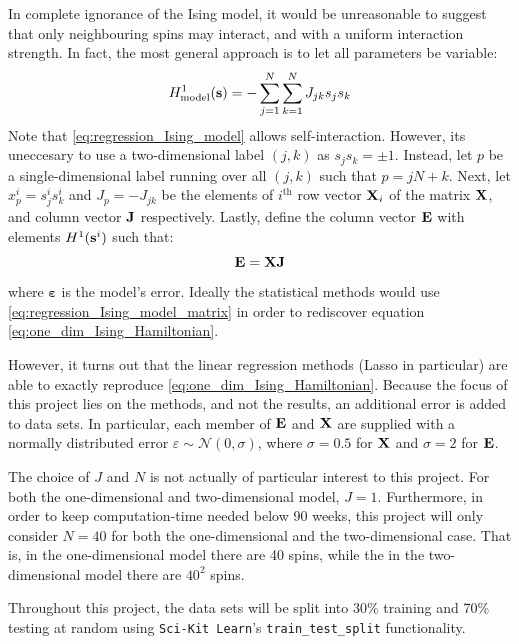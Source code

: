 \documentclass[nofootinbib,reprint,english]{revtex4-1}
\newcommand{\X}{\vb{X}}
\begin{document}
In complete ignorance of the Ising model, it would be unreasonable to suggest that only neighbouring spins may interact, and with a uniform interaction strength. In fact, the most general approach is to let all parameters be variable:
\begin{equation}\label{eq:regression_Ising_model}
H_\text{model}^1(\vb{s})=-\sum_{j=1}^N\sum_{k=1}^NJ_{jk}s_js_k
\end{equation}
Note that \eqref{eq:regression_Ising_model} allows self-interaction. However, its uneccesary to use a two-dimensional label \((j,k)\) as \(s_js_k=\pm1\). Instead, let \(p\) be a single-dimensional label running over all \((j,k)\) such that \(p=jN+k\). Next, let \(x_p^i=s_j^is_k^i\) and \(J_p=-J_{jk}\) be the elements of \(i^\text{th}\) row vector \(\X_i\) of the matrix \(\X\), and column vector \(\vb{J}\) respectively. Lastly, define the column vector \(\vb{E}\) with elements \(H^1(\vb{s}^i)\) such that:
\begin{equation}\label{eq:regression_Ising_model_matrix}
\vb{E}=\X\vb{J}
\end{equation}
where \(\boldsymbol{\varepsilon}\) is the model's error. Ideally the statistical methods would use \eqref{eq:regression_Ising_model_matrix} in order to rediscover equation \eqref{eq:one_dim_Ising_Hamiltonian}.

However, it turns out that the linear regression methods (Lasso in particular) are able to exactly reproduce \eqref{eq:one_dim_Ising_Hamiltonian}. Because the focus of this project lies on the methods, and not the results, an additional error is added to data sets. In particular, each member of \(\vb{E}\) and \(\X\) are supplied with a normally distributed error \(\varepsilon\sim\mathcal{N}(0,\sigma)\), where \(\sigma=0.5\) for \(\X\)  and \(\sigma=2\) for \(\vb{E}\).

The choice of \(J\) and \(N\) is not actually of particular interest to this project. For both the one-dimensional and two-dimensional model, \(J=1\). Furthermore, in order to keep computation-time needed below 90 weeks, this project will only consider \(N=40\) for both the one-dimensional and the two-dimensional case. That is, in the one-dimensional model there are 40 spins, while the in the two-dimensional model there are \(40^2\) spins.

Throughout this project, the data sets will be split into 30\% training and 70\% testing at random using \texttt{Sci-Kit Learn}'s \texttt{train\_test\_split} functionality.
\end{document}
